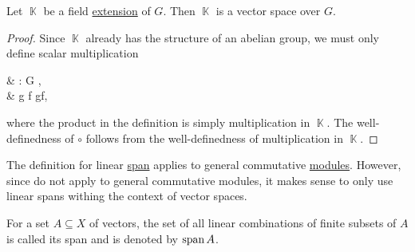 \begin{proposition}\label{thm:field_extension_is_vector_space}
  Let \( \BbbK \) be a field \hyperref[def:field_extension]{extension} of \( G \). Then \( \BbbK \) is a vector space over \( G \).
\end{proposition}
\begin{proof}
  Since \( \BbbK \) already has the structure of an abelian group, we must only define scalar multiplication
  \begin{balign*}
     & \circ: G \times \BbbK \to \BbbK, \\
     & g \circ f \coloneqq gf,
  \end{balign*}
  where the product in the definition is simply multiplication in \( \BbbK \). The well-definedness of \( \circ \) follows from the well-definedness of multiplication in \( \BbbK \).
\end{proof}

\begin{remark}\label{rem:linear_span_only_for_vector_spaces}
  The definition for linear \hyperref[def:linear_span]{span} applies to general commutative \hyperref[def:left_module]{modules}. However, since  do not apply to general commutative modules, it makes sense to only use linear spans withing the context of vector spaces.
\end{remark}

\begin{definition}\label{def:linear_span}
  For a set \( A \subseteq X \) of vectors, the set of all linear combinations of finite subsets of \( A \) is called its span and is denoted by \( \operatorname{span}{A} \).
\end{definition}

